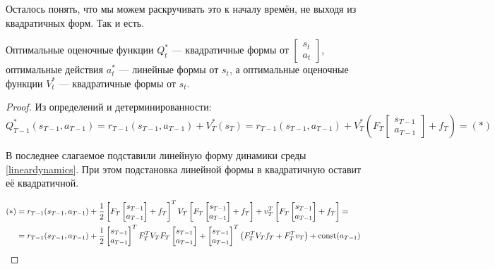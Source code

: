Осталось понять, что мы можем раскручивать это к началу времён, не выходя из квадратичных форм. Так и есть.

\begin{theorem}
Оптимальные оценочные функции $Q_t^*$ --- квадратичные формы от $\begin{bmatrix} s_t \\ a_t \end{bmatrix}$, оптимальные действия $a_t^*$ --- линейные формы от $s_t$, а оптимальные оценочные функции $V_t^*$ --- квадратичные формы от $s_t$.
\begin{proof}
Из определений и детерминированности:
$$Q^*_{T-1}(s_{T-1}, a_{T-1}) = r_{T-1}(s_{T-1}, a_{T-1}) + V^*_T(s_T) = r_{T-1}(s_{T-1}, a_{T-1}) + V^*_T \left( F_T \begin{bmatrix} s_{T-1} \\ a_{T-1} \end{bmatrix} + f_T \right) = (*)$$

В последнее слагаемое подставили линейную форму динамики среды \eqref{lineardynamics}. При этом подстановка линейной формы в квадратичную оставит её квадратичной.

\begin{align*}
    (*) &= r_{T-1}(s_{T-1}, a_{T-1}) + \frac{1}{2} \left[ F_T \begin{bmatrix} s_{T-1} \\ a_{T-1} \end{bmatrix} + f_T \right]^T V_T \left[ F_T \begin{bmatrix} s_{T-1} \\ a_{T-1} \end{bmatrix} + f_T \right] + v_T^T \left[ F_T \begin{bmatrix} s_{T-1} \\ a_{T-1} \end{bmatrix} + f_T \right] = \\
    &= r_{T-1}(s_{T-1}, a_{T-1}) + \frac{1}{2} \begin{bmatrix} s_{T-1} \\ a_{T-1} \end{bmatrix}^T F_T^TV_TF_T \begin{bmatrix} s_{T-1} \\ a_{T-1} \end{bmatrix} + \begin{bmatrix} s_{T-1} \\ a_{T-1} \end{bmatrix}^T \left( F_T^T V_T f_T + F_T^T v_T \right) + \operatorname{const}(a_{T-1})
\end{align*}


\end{proof}
\end{theorem}
